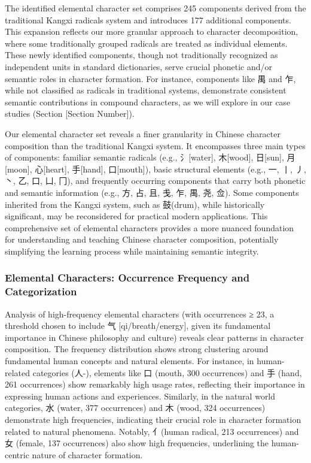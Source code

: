 The identified elemental character set comprises 245 components derived
from the traditional Kangxi radicals system and introduces 177
additional components. This expansion reflects our more granular
approach to character decomposition, where some traditionally grouped
radicals are treated as individual elements. These newly identified
components, though not traditionally recognized as independent units in
standard dictionaries, serve crucial phonetic and/or semantic roles in
character formation. For instance, components like 禺 and 乍, while not
classified as radicals in traditional systems, demonstrate consistent
semantic contributions in compound characters, as we will explore in our
case studies (Section {[}Section Number{]}).

Our elemental character set reveals a finer granularity in Chinese
character composition than the traditional Kangxi system. It encompasses
three main types of components: familiar semantic radicals (e.g.,
氵{[}water{]}, 木{[}wood{]}, 日{[}sun{]}, 月{[}moon{]}, 心{[}heart{]},
手{[}hand{]}, 口{[}mouth{]}), basic structural elements (e.g., 一, 丨,
丿, 丶, 乙, 口, 凵, 冂), and frequently occurring components that carry
both phonetic and semantic information (e.g., 方, 占, 且, 戋, 乍, 禺,
尧, 佥). Some components inherited from the Kangxi system, such as
鼓(drum), while historically significant, may be reconsidered for
practical modern applications. This comprehensive set of elemental
characters provides a more nuanced foundation for understanding and
teaching Chinese character composition, potentially simplifying the
learning process while maintaining semantic integrity.

\hypertarget{elemental-characters-occurrence-frequency-and-categorization}{%
\subsubsection{Elemental Characters: Occurrence Frequency and
Categorization}\label{elemental-characters-occurrence-frequency-and-categorization}}

Analysis of high-frequency elemental characters (with occurrences ≥ 23,
a threshold chosen to include 气 {[}qi/breath/energy{]}, given its
fundamental importance in Chinese philosophy and culture) reveals clear
patterns in character composition. The frequency distribution shows
strong clustering around fundamental human concepts and natural
elements. For instance, in human-related categories (人-), elements like
口 (mouth, 300 occurrences) and 手 (hand, 261 occurrences) show
remarkably high usage rates, reflecting their importance in expressing
human actions and experiences. Similarly, in the natural world
categories, 水 (water, 377 occurrences) and 木 (wood, 324 occurrences)
demonstrate high frequencies, indicating their crucial role in character
formation related to natural phenomena. Notably, 亻(human radical, 213
occurrences) and 女 (female, 137 occurrences) also show high
frequencies, underlining the human-centric nature of character
formation.

